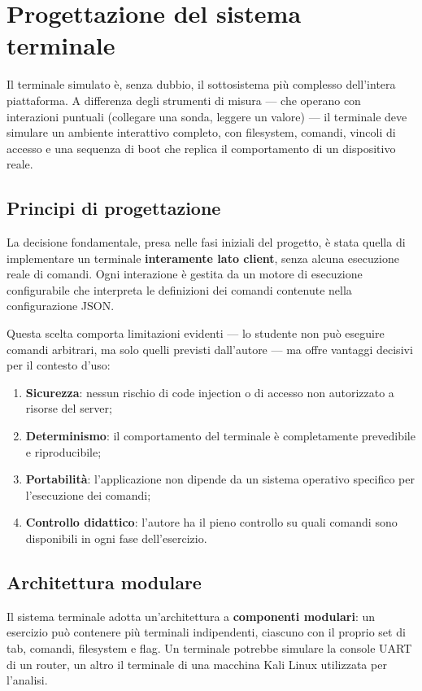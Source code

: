 \section{Progettazione del sistema terminale}
\label{sec:progettazione-terminale}

Il terminale simulato è, senza dubbio, il sottosistema più complesso dell'intera piattaforma. A differenza degli strumenti di misura --- che operano con interazioni puntuali (collegare una sonda, leggere un valore) --- il terminale deve simulare un ambiente interattivo completo, con filesystem, comandi, vincoli di accesso e una sequenza di boot che replica il comportamento di un dispositivo reale.

\subsection{Principi di progettazione}

La decisione fondamentale, presa nelle fasi iniziali del progetto, è stata quella di implementare un terminale \textbf{interamente lato client}, senza alcuna esecuzione reale di comandi. Ogni interazione è gestita da un motore di esecuzione configurabile che interpreta le definizioni dei comandi contenute nella configurazione JSON.

Questa scelta comporta limitazioni evidenti --- lo studente non può eseguire comandi arbitrari, ma solo quelli previsti dall'autore --- ma offre vantaggi decisivi per il contesto d'uso:

\begin{enumerate}
    \item \textbf{Sicurezza}: nessun rischio di code injection o di accesso non autorizzato a risorse del server;
    \item \textbf{Determinismo}: il comportamento del terminale è completamente prevedibile e riproducibile;
    \item \textbf{Portabilità}: l'applicazione non dipende da un sistema operativo specifico per l'esecuzione dei comandi;
    \item \textbf{Controllo didattico}: l'autore ha il pieno controllo su quali comandi sono disponibili in ogni fase dell'esercizio.
\end{enumerate}

\subsection{Architettura modulare}

Il sistema terminale adotta un'architettura a \textbf{componenti modulari}: un esercizio può contenere più terminali indipendenti, ciascuno con il proprio set di tab, comandi, filesystem e flag. Un terminale potrebbe simulare la console UART di un router, un altro il terminale di una macchina Kali Linux utilizzata per l'analisi.

